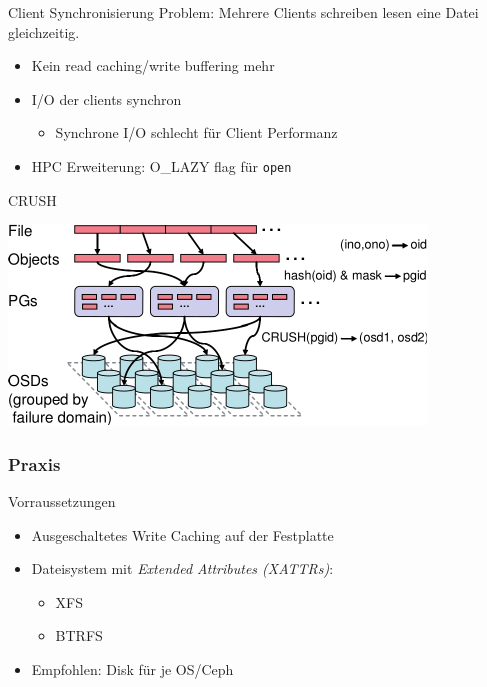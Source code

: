 \documentclass[hyperref={xetex}]{beamer}
\begin{document}
\begin{frame}{Client Synchronisierung}
	Problem: Mehrere Clients schreiben lesen eine Datei gleichzeitig.

	\begin{itemize}	
		\item Kein read caching/write buffering mehr
		\item I/O der clients synchron %
			\begin{itemize}
				\item Synchrone I/O schlecht f\"ur Client Performanz
			\end{itemize}
		\item HPC Erweiterung: O\_LAZY flag f\"ur \texttt{open}
	\end{itemize}
\end{frame}


\begin{frame}{CRUSH}
	\begin{center}
	\includegraphics{images/crush.pdf}
\end{center}
\end{frame}

\subsubsection{Praxis}


\begin{frame}{Vorraussetzungen}
	\begin{itemize}
		\item Ausgeschaltetes Write Caching auf der Festplatte
		\item Dateisystem mit \emph{Extended Attributes (XATTRs)}:
		\begin{itemize}
			\item XFS
			\item BTRFS
		\end{itemize}
		\item Empfohlen: Disk f\"ur je OS/Ceph

	\end{itemize}
\end{frame}
\end{document}
